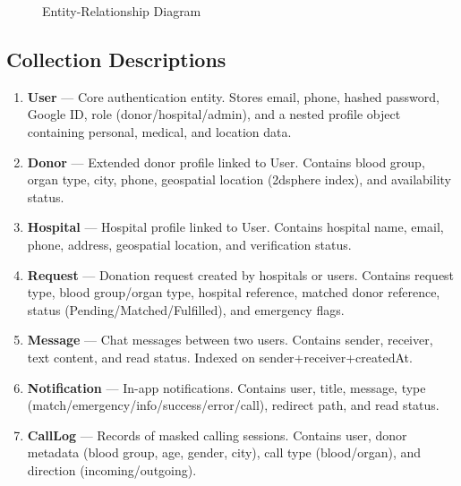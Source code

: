 \documentclass[12pt,a4paper]{article}
\begin{document}
\begin{figure}[H]
\caption{Entity-Relationship Diagram}
\end{figure}

\subsection{Collection Descriptions}

\begin{enumerate}[leftmargin=*]
    \item \textbf{User} --- Core authentication entity. Stores email, phone, hashed password, Google ID, role (donor/hospital/admin), and a nested profile object containing personal, medical, and location data.
    \item \textbf{Donor} --- Extended donor profile linked to User. Contains blood group, organ type, city, phone, geospatial location (2dsphere index), and availability status.
    \item \textbf{Hospital} --- Hospital profile linked to User. Contains hospital name, email, phone, address, geospatial location, and verification status.
    \item \textbf{Request} --- Donation request created by hospitals or users. Contains request type, blood group/organ type, hospital reference, matched donor reference, status (Pending/Matched/Fulfilled), and emergency flags.
    \item \textbf{Message} --- Chat messages between two users. Contains sender, receiver, text content, and read status. Indexed on sender+receiver+createdAt.
    \item \textbf{Notification} --- In-app notifications. Contains user, title, message, type (match/emergency/info/success/error/call), redirect path, and read status.
    \item \textbf{CallLog} --- Records of masked calling sessions. Contains user, donor metadata (blood group, age, gender, city), call type (blood/organ), and direction (incoming/outgoing).
\end{enumerate}
\end{document}
